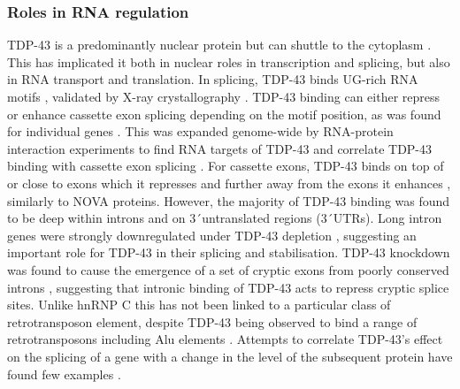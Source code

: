 \subsubsection{Roles in RNA regulation}

TDP-43 is a predominantly nuclear protein but can shuttle to the cytoplasm \citep{Ayala2008}. 
This has implicated it both in nuclear roles in transcription and splicing, but also in RNA transport and translation. 
In splicing, TDP-43 binds UG-rich RNA motifs \citep{Buratti2001a, Buratti2001}, validated by X-ray crystallography \citep{Lukavsky2013}. 
TDP-43 binding can either repress or enhance cassette exon splicing depending on the motif position, as was found for individual genes \citep{Mercado2005-js,Bose2008-du,Shiga2012-it}.
This was expanded genome-wide by RNA-protein interaction experiments to find RNA targets of TDP-43 and correlate TDP-43 binding with cassette exon splicing \citep{Polymenidou2011,Tollervey2011,Kapeli2016}. %
For cassette exons, TDP-43 binds on top of or close to exons which it represses and further away from the exons it enhances \citep{Tollervey2011}, similarly to NOVA proteins.
However, the majority of TDP-43 binding was found to be deep within introns and on 3\'\ untranslated regions (3\'\ UTRs).
Long intron genes were strongly downregulated under TDP-43 depletion \citep{Polymenidou2011}, suggesting an important role for TDP-43 in their splicing and stabilisation. 
TDP-43 knockdown was found to cause the emergence of a set of cryptic exons from poorly conserved introns \citep{Ling2015}, suggesting that intronic binding of TDP-43 acts to repress cryptic splice sites. 
Unlike hnRNP C this has not been linked to a particular class of retrotransposon element, despite TDP-43 being observed to bind a range of retrotransposons including Alu elements \citep{Li2012,Zarnack2013,Kelley2014}.
Attempts to correlate TDP-43's effect on the splicing of a gene with a change in the level of the subsequent protein have found few examples \citep{DeConti2015,Stalekar2015}.


